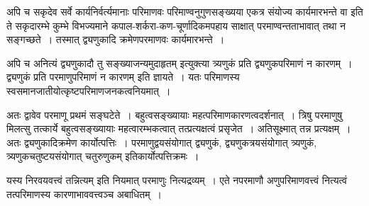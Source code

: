 {अपि च सकृदेव सर्वे कार्यनिर्वर्त्यमानाः परिमाणवः परिमाण्वनुगुणसङ्ख्यया एकत्र संयोज्य कार्यमारभन्ते वा इति ते सकृदारम्भे कुम्भे विभज्यमाने कपाल-शर्करा-कण-चूर्णादिकमपहाय साक्षात् परमाण्वन्तताभावात् तथा न सङ्गच्छते~। तस्मात् द्व्यणुकादि क्रमेणपरमाणवः कार्यमारभन्ते~। 

अपि च अनित्यं द्व्यणुकादौ तु सङ्ख्याजन्यमुदाहृतम् इत्युक्त्या त्र्यणुकं प्रति द्व्यणुकपरिमाणं न कारणम्~। द्व्यणुकं प्रति परमाणुपरिमाणं न कारणम् इति ज्ञायते~। यतः परिमाणस्य स्वसमानजातीयोत्कृष्टपरिमाणजनकत्वनियमात्~। 

अतः द्वावेव परमाणू प्रथमं सङ्घटेते~। बहुत्वसङ्ख्यायाः महत्परिमाणकारणत्वदर्शनात्~। त्रिषु परमाणुषु मिलत्सु तत्कार्ये बहुत्वसङ्ख्यायाः महत्वारम्भकत्वात् तत्प्रत्यक्षत्वं प्रसृजेत~। अतिसूक्ष्मात् तन्न प्रत्यक्षम्~। अतः द्व्यणुकादिक्रमेण कार्योत्पत्तिः~। परमाणुद्वयसंयोगात् द्व्यणुकं, द्व्यणुकत्रयसंयोगात् त्र्यणुकं, त्र्यणुकचतुष्टयसंयोगात् चतुरुणुकम् इति\break कार्योत्पत्तिक्रमः~। 

यस्य निरवयवत्त्वं तन्नित्यम् इति नियमात् परमाणुः नित्यद्रव्यम्~। एते नपरमाणौ अणुपरिमाणवत्त्वं नित्यत्वं तत्परिमाणस्य कारणाभाववत्त्वञ्च अबाधितम्~। 

\articleend
}
